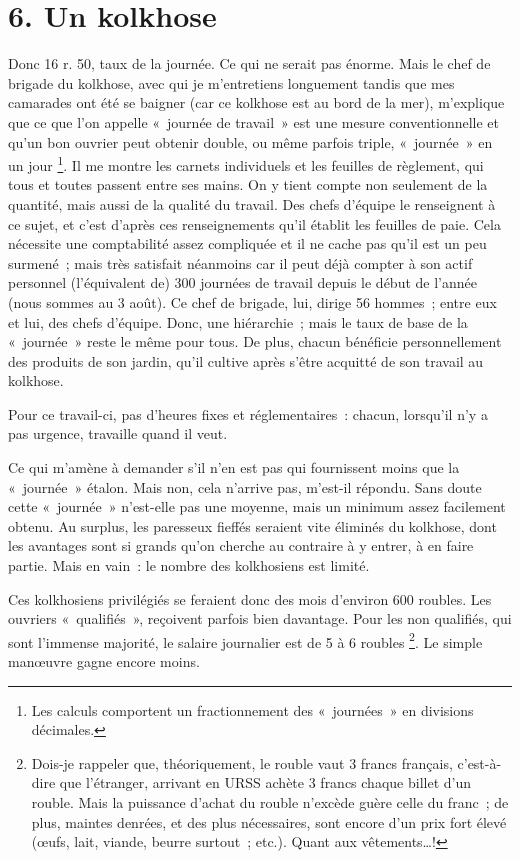 \documentclass[twoside]{book} %
\begin{document}
\section[{6. Un kolkhose}]{6. Un kolkhose}

\noindent Donc 16 r. 50, taux de la journée. Ce qui ne serait pas énorme. Mais le chef de brigade du kolkhose, avec qui je m’entretiens longuement tandis que mes camarades ont été se baigner (car ce kolkhose est au bord de la mer), m’explique que ce que l’on appelle « journée de travail » est une mesure conventionnelle et qu’un bon ouvrier peut obtenir double, ou même parfois triple, « journée » en un jour \footnote{Les calculs comportent un fractionnement des « journées » en divisions décimales.}. Il me montre les carnets individuels et les feuilles de règlement, qui tous et toutes passent entre ses mains. On y tient compte non seulement de la quantité, mais aussi de la qualité du travail. Des chefs d’équipe le renseignent à ce sujet, et c’est d’après ces renseignements qu’il établit les feuilles de paie. Cela nécessite une comptabilité assez compliquée et il ne cache pas qu’il est un peu surmené ; mais très satisfait néanmoins car il peut déjà compter à son actif personnel (l’équivalent de) 300 journées de travail depuis le début de l’année (nous sommes au 3 août). Ce chef de brigade, lui, dirige 56 hommes ; entre eux et lui, des chefs d’équipe. Donc, une hiérarchie ; mais le taux de base de la « journée » reste le même pour tous. De plus, chacun bénéficie personnellement des produits de son jardin, qu’il cultive après s’être acquitté de son travail au kolkhose.\par
Pour ce travail-ci, pas d’heures fixes et réglementaires : chacun, lorsqu’il n’y a pas urgence, travaille quand il veut.\par
Ce qui m’amène à demander s’il n’en est pas qui fournissent moins que la « journée » étalon. Mais non, cela n’arrive pas, m’est-il répondu. Sans doute cette « journée » n’est-elle pas une moyenne, mais un minimum assez facilement obtenu. Au surplus, les paresseux fieffés seraient vite éliminés du kolkhose, dont les avantages sont si grands qu’on cherche au contraire à y entrer, à en faire partie. Mais en vain : le nombre des kolkhosiens est limité.\par
Ces kolkhosiens privilégiés se feraient donc des mois d’environ 600 roubles. Les ouvriers « qualifiés », reçoivent parfois bien davantage. Pour les non qualifiés, qui sont l’immense majorité, le salaire journalier est de 5 à 6 roubles \footnote{Dois-je rappeler que, théoriquement, le rouble vaut 3 francs français, c’est-à-dire que l’étranger, arrivant en URSS achète 3 francs chaque billet d’un rouble. Mais la puissance d’achat du rouble n’excède guère celle du franc ; de plus, maintes denrées, et des plus nécessaires, sont encore d’un prix fort élevé (œufs, lait, viande, beurre surtout ; etc.). Quant aux vêtements…!}. Le simple manœuvre gagne encore moins.\par
\end{document}
